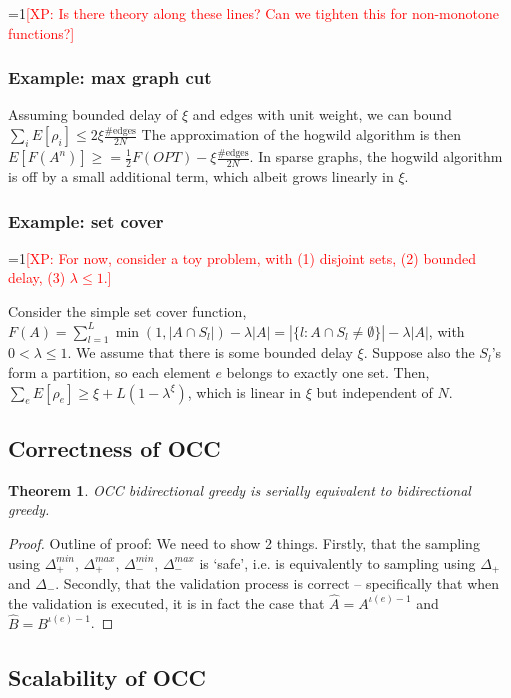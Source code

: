 \documentclass{article} %
\newtheorem{thm}{Theorem}[section]
\newcommand{\Comments}{1}
\newcommand{\note}[2]{\ifnum\Comments=1\textcolor{#1}{#2}\fi}
\newcommand{\xinghao}[1]{\note{red}{[XP: #1]}}
\begin{document}
\xinghao{Is there theory along these lines? Can we tighten this for non-monotone functions?}


\subsubsection{Example: max graph cut}
Assuming bounded delay of $\xi$ and edges with unit weight, we can bound $\sum_i E[\rho_i] \leq 2\xi\frac{\text{\#edges}}{2N}$
The approximation of the hogwild algorithm is then $E[F(A^n)] \geq = \frac{1}{2} F(OPT) - \xi\frac{\#\text{edges}}{2N}$.
In sparse graphs, the hogwild algorithm is off by a small additional term, which albeit grows linearly in $\xi$.



\subsubsection{Example: set cover}
\xinghao{For now, consider a toy problem, with (1) disjoint sets, (2) bounded delay, (3) $\lambda \leq 1$.}

Consider the simple set cover function,
$F(A) = \sum_{l=1}^L \min(1,|A\cap S_l|) - \lambda|A| = |\{l: A\cap S_l \neq\emptyset\}| - \lambda|A|$,
with $0 < \lambda \leq 1$.
We assume that there is some bounded delay $\xi$.
Suppose also the $S_l$'s form a partition, so each element $e$ belongs to exactly one set.
Then, $\sum_e E[\rho_e] \geq \xi + L(1-\lambda^\xi)$, which is linear in $\xi$ but independent of $N$.


\subsection{Correctness of OCC}
\begin{thm} OCC bidirectional greedy is serially equivalent to bidirectional greedy.
\end{thm}
\begin{proof}
Outline of proof: We need to show 2 things.
Firstly, that the sampling using $\Delta_+^{min}$, $\Delta_+^{max}$, $\Delta_-^{min}$, $\Delta_-^{max}$ is `safe', i.e. is equivalently to sampling using $\Delta_+$ and $\Delta_-$.
Secondly, that the validation process is correct -- specifically that when the validation is executed, it is in fact the case that $\hat{A} = A^{\iota(e)-1}$ and $\hat{B} = B^{\iota(e)-1}$.
\end{proof}



\subsection{Scalability of OCC}
\end{document}

